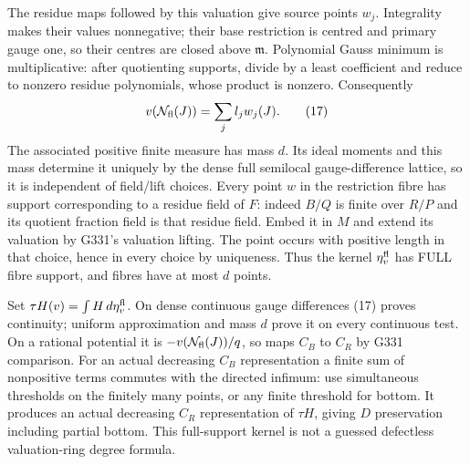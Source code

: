 The residue maps followed by this valuation give source points $w_j$. Integrality makes their values nonnegative; their base restriction is centred and primary gauge one, so their centres are closed above $\mathfrak m$. Polynomial Gauss minimum is multiplicative: after quotienting supports, divide by a least coefficient and reduce to nonzero residue polynomials, whose product is nonzero. Consequently
\[
 v(\mathcal N_{\rm fl}(J))=\sum_j l_jw_j(J). \tag{17}
\]
The associated positive finite measure has mass $d$. Its ideal moments and this mass determine it uniquely by the dense full semilocal gauge-difference lattice, so it is independent of field/lift choices. Every point $w$ in the restriction fibre has support corresponding to a residue field of $F$: indeed $B/Q$ is finite over $R/P$ and its quotient fraction field is that residue field. Embed it in $M$ and extend its valuation by G331's valuation lifting. The point occurs with positive length in that choice, hence in every choice by uniqueness. Thus the kernel $\eta_v^{\rm fl}$ has FULL fibre support, and fibres have at most $d$ points.

Set $\tau H(v)=\int H\,d\eta_v^{\rm fl}$. On dense continuous gauge differences (17) proves continuity; uniform approximation and mass $d$ prove it on every continuous test. On a rational potential it is $-v(\mathcal N_{\rm fl}(J))/q$, so maps $C_B$ to $C_R$ by G331 comparison. For an actual decreasing $C_B$ representation a finite sum of nonpositive terms commutes with the directed infimum: use simultaneous thresholds on the finitely many points, or any finite threshold for bottom. It produces an actual decreasing $C_R$ representation of $\tau H$, giving $D$ preservation including partial bottom. This full-support kernel is not a guessed defectless valuation-ring degree formula.

